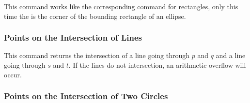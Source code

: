 \begin{command}{\pgfpointborderellipse{}}
    This command works like the corresponding command for rectangles, only this
    time the  is the corner of the bounding rectangle of an
    ellipse.
\begin{codeexample}[]
\end{codeexample}
\end{command}


\subsubsection{Points on the Intersection of Lines}

\begin{command}{\pgfpointintersectionoflines{}}
    This command returns the intersection of a line going through $p$ and $q$
    and a line going through $s$ and $t$. If the lines do not intersection, an
    arithmetic overflow will occur.
\begin{codeexample}[]
\end{codeexample}
\end{command}


\subsubsection{Points on the Intersection of Two Circles}

